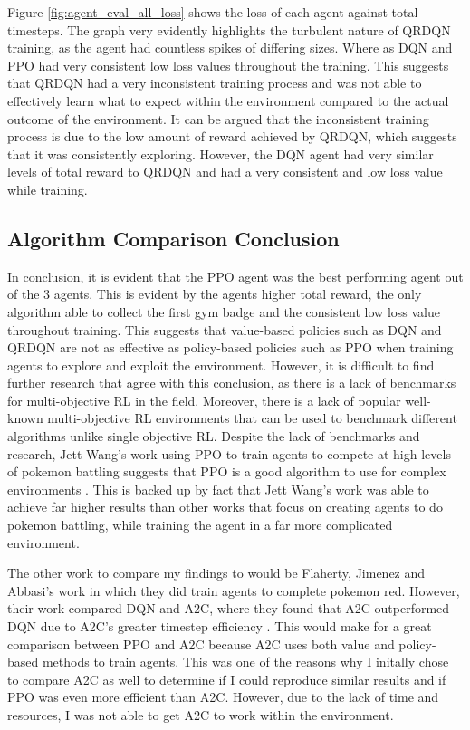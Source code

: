 Figure \ref{fig:agent_eval_all_loss} shows the loss of each agent against total timesteps. The graph very evidently highlights the turbulent nature of QRDQN training, as the agent had countless spikes of differing sizes. Where as DQN and PPO had very consistent low loss values throughout the training. This suggests that QRDQN had a very inconsistent training process and was not able to effectively learn what to expect within the environment compared to the actual outcome of the environment. It can be argued that the inconsistent training process is due to the low amount of reward achieved by QRDQN, which suggests that it was consistently exploring. However, the DQN agent had very similar levels of total reward to QRDQN and had a very consistent and low loss value while training. 

\subsection{Algorithm Comparison Conclusion}

In conclusion, it is evident that the PPO agent was the best performing agent out of the 3 agents. This is evident by the agents higher total reward, the only algorithm able to collect the first gym badge and the consistent low loss value throughout training. This suggests that value-based policies such as DQN and QRDQN are not as effective as policy-based policies such as PPO when training agents to explore and exploit the environment. However, it is difficult to find further research that agree with this conclusion, as there is a lack of benchmarks for multi-objective RL in the field. Moreover, there is a lack of popular well-known multi-objective RL environments that can be used to benchmark different algorithms unlike single objective RL. Despite the lack of benchmarks and research, Jett Wang's work using PPO to train agents to compete at high levels of pokemon battling suggests that PPO is a good algorithm to use for complex environments \cite{wang2020playing}. This is backed up by fact that Jett Wang's work was able to achieve far higher results than other works that focus on creating agents to do pokemon battling, while training the agent in a far more complicated environment. 

The other work to compare my findings to would be Flaherty, Jimenez and Abbasi's work in which they did train agents to complete pokemon red. However, their work compared DQN and A2C, where they found that A2C outperformed DQN due to A2C's greater timestep efficiency \cite{flaherty2021playing}. This would make for a great comparison between PPO and A2C because A2C uses both value and policy-based methods to train agents. This was one of the reasons why I initally chose to compare A2C as well to determine if I could reproduce similar results and if PPO was even more efficient than A2C. However, due to the lack of time and resources, I was not able to get A2C to work within the environment. 

